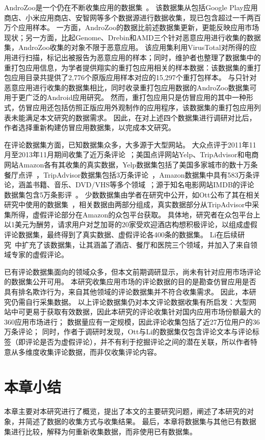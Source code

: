 AndroZoo是一个仍在不断收集应用的数据集~\cite{li2017androzoo++}。
该数据集从包括Google Play应用商店、小米应用商店、安智网等多个数据源进行数据收集，现已包含超过一千两百万个应用样本。
一方面，AndroZoo的数据比前述数据集更新，更能反映应用市场现状；另一方面，比起Genome、Drebin和AMD三个针对恶意应用进行收集的数据集，AndroZoo收集的对象不限于恶意应用。
该应用集利用VirusTotal对所得的应用进行扫描，标记出被报告为恶意应用的样本；同时，维护者也整理了数据集中的重打包应用信息，为学者提供翔实的重打包应用相关的样本数据：该数据集的重打包应用目录共提供了2,776个原版应用样本对应的15,297个重打包样本。
与只针对恶意应用进行收集的数据集相比，同时收录重打包应用数据的AndroZoo数据集可用于更广泛的Android应用研究。
然而，重打包应用只是仿冒应用的其中一种形式，仿冒应用还包括仿照正版应用外观制作的应用程序，该数据集的重打包应用列表未能满足本文研究的数据需求。
因此，在对上述四个数据集进行调研对比后，作者选择重新构建仿冒应用数据集，以完成本文研究。

在评论数据集方面，已知数据集众多，大多源于大型网站。
大众点评于2011年11月至2013年11月期间收集了近万条评论~\cite{li2017bimodal}；美国点评网站Yelp、TripAdvisor和电商网站Amazon各有其收集的真实数据，Yelp数据集包括了美国多家城市的数十万条餐厅点评~\cite{rayana2015collective, shehnepoor2017netspam}，TripAdvisor数据集包括3万条评论~\cite{wu2010distortion}，Amazon数据集中具有583万条评论，涵盖书籍、音乐、DVD/VHS等多个领域~\cite{jindal2008opinion}；源于知名电影网站IMDB的评论数据集包含5万条影评~\cite{maas2011learning}。
少数数据集由学者在研究中公开，如Ott公布了其在相关研究中使用的数据集~\cite{ott2011finding}，相关数据由两部分组成，真实数据部分从TripAdvisor中采集所得，虚假评论部分在Amazon的众包平台获取。
具体地，研究者在众包平台上以1美元为酬劳，请求用户对芝加哥的20家受欢迎酒店构想积极评论，以组成虚假评论数据集，最终得到了真实数据、虚假评论各400条的数据集。
Li在后续研究~\cite{li2014towards}中扩充了该数据集，让其涵盖了酒店、餐厅和医院三个领域，并加入了来自领域专家的虚假评论。

已有评论数据集面向的领域众多，但本文前期调研显示，尚未有针对应用市场评论的数据集公开可用。
本研究收集应用市场的评论数据的目的是勘查仿冒应用是否具有排名欺诈行为，来自其他领域的评论数据集并不符合收集需求。
因此，本研究仍需自行采集数据。
以上评论数据集仍对本文评论数据收集有所启发：大型网站中可更易于获取有效数据，因此本研究的评论收集针对国内应用市场份额最大的360应用市场进行；
数据量应有一定规模，因此评论收集包括了近27万位用户的36万条评论；
同时，作者于调研时发现，Ott与Li的数据集仅包含评论文本与评论标签（即评论是否为虚假评论），并不有利于挖掘评论之间的潜在关联，所以作者特意从多维度收集评论数据，而非仅收集评论内容。


\section{本章小结}

本章主要对本研究进行了概览，提出了本文的主要研究问题，阐述了本研究的对象，并简述了数据的收集方式与收集结果。
最后，本章将数据集与其他已有数据集进行比较，解释为何重新收集数据，而非使用已有数据集。
